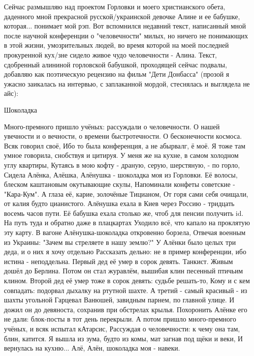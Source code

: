 Сейчас размышляю над проектом Горловки и моего христианского обета, даденного
мной  прекрасной русской/украинской девочке Алине и ее бабушке, которая...
понимает мой рэп. Вот вспомнился недавний текст, написанный мной после научной
конференции о "человечности" милых, но ничего не понимающих в этой жизни,
умозрительных людей, во время которой на моей последней прокуренной кух/зне
сидело живое чудо человечности - Алина. Текст, сдобренный алининой горловской
бабушкой, проходящей сейчас подвалы, добавляю как поэтическую рецензию на фильм
"Дети Донбасса" (прозой я ужасно заикалась на интервью, с заплаканной мордой,
стеснялась и выглядела не айс): 

Шоколадка

\obeycr
Много-премного пришло учёных: рассуждали о человечности.
О нашей увечности и о вечности, о времени быстротечности.
О бесконечности космоса. Всяк говорил своё,
Ибо то была конференция, а не абырвалг, ё моё.
Я тоже там умное говорила, снобствуя и цитируя.
У меня же на кухне, в самом холодном углу квартиры,
Кутаясь в мою кофту - драную, серую, шерстяную, - по горло,
Сидела Алёнка, Алёшка, Алёнушка - шоколадка моя из Горловки.
Её волосы, блеском каштановым окутывающие скулы,
Напоминали конфеты советские - "Кара-Кум".
А глаза её, карие, золочёные Тицианом,
От горя сами себя очищали, от калия будто цианистого.
Алёнушка ехала в Киев через Россию - тридцать восемь часов пути.
Её бабушка ехала столько же, чтоб для пенсии получить id.
На путь туда и обратно даже в плацкартах 
Уходило всё, что капало на проклятую эту карту.
В вагоне Алёнушка-шоколадка откровенно борзела,
Отвечая военным из Украины: "Зачем вы стреляете в нашу землю?"
У Алёнки было целых три деда, и о них я хочу отдельно
Рассказать дельно: не в пример конференции, ибо истина - неподдельна.
Первый дед её умер в сорок девять. Танкист. Живым дошёл до Берлина.
Потом он стал журавлём, вышибая клин песенный птичьим клином.
Второй дед её умер тоже в сорок девять: судьбе решать-то,
Кому и с кем совпадать: подорвал дыхалку на ртутной шахте.
А третий - самый красивый - из шахты угольной
Гарцевал Ванюшей, завидным парнем, по главной улице.
И дожил он до девяноста, сохранив при обстрелах крылья.
Похоронить Алёнке его не дали: блок-посты в тот день перекрыли.
А потом пришло много-премного учёных, и всяк испытал кАтарсис,
Рассуждая о человечности: к чему она там, блин, катится.
Я вышла из зума, будто из комы, мат загнав под щёки и веки,
И вернулась на кухню... Алё, Алён, шоколадка моя - навеки.
\restorecr
